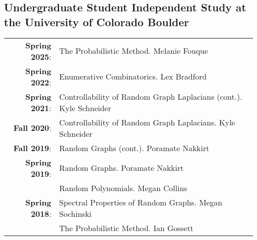 \documentclass[letterpaper]{article}
\renewenvironment{itemize}{
  \begin{list}{}{
    \setlength{\leftmargin}{1em}
  }
}{
  \end{list}
}
\begin{document}
   \subsection*{Undergraduate Student Independent Study at the University of Colorado Boulder}
   \begin{tabular}{r l}
   	{\bf Spring 2025}: & The Probabilistic Method.  Melanie Fouque  \\
   	{\bf Spring 2022}: & Enumerative Combinatorics.  Lex Bradford \\
   	{\bf Spring 2021}: & Controllability of Random Graph Laplacians (cont.). Kyle Schneider \\
   	{\bf Fall 2020}: & Controllability of Random Graph Laplacians. Kyle Schneider \\
   	{\bf Fall 2019}: & Random Graphs (cont.).  Poramate Nakkirt \\
   	{\bf Spring 2019}: & Random Graphs.  Poramate Nakkirt  \\
   				& Random Polynomials.  Megan Collins \\
   	{\bf Spring 2018}: & Spectral Properties of Random Graphs.  Megan Sochinski \\
   				& The Probabilistic Method.  Ian Gossett
   \end{tabular}
   
   
\end{document}
